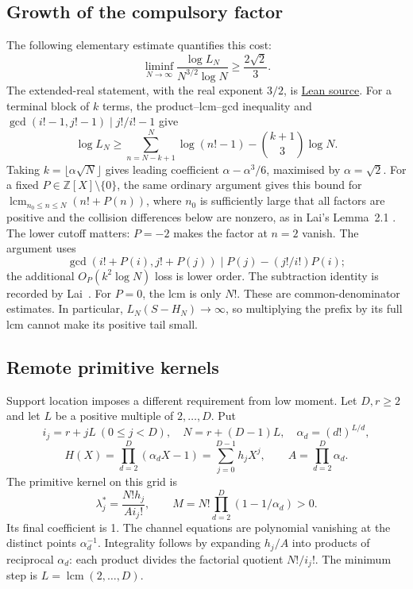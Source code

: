 \documentclass[11pt]{article}
\begin{document}
\subsection{Growth of the compulsory factor}
The following elementary estimate quantifies this cost:
\begin{equation}
\liminf_{N\to\infty}\frac{\log L_N}{N^{3/2}\log N}
\ge\frac{2\sqrt2}{3}.\label{res:lcm-growth}
\end{equation}
The extended-real statement, with the real exponent $3/2$, is
\href{https://github.com/wcook04/plectis-erdos/blob/f36a98bf3d3e6f65f1074e3b800e3293d5b8a51a/ErdosProblems/Erdos68/PaperCompleteLiminf.lean#L42}{Lean source}.
For a terminal block of $k$ terms, the product--lcm--gcd inequality and
$\gcd(i!-1,j!-1)\mid j!/i!-1$ give
\[
\log L_N\ge\sum_{n=N-k+1}^N\log(n!-1)
-\binom{k+1}{3}\log N.
\]
Taking $k=\lfloor\alpha\sqrt N\rfloor$ gives leading coefficient
$\alpha-\alpha^3/6$, maximised by $\alpha=\sqrt2$.  For a fixed
$P\in\mathbb Z[X]\setminus\{0\}$, the same ordinary argument gives this
bound for $\operatorname{lcm}_{n_0\le n\le N}(n!+P(n))$, where $n_0$ is
sufficiently large that all factors are positive and the collision
differences below are nonzero, as in Lai's Lemma~2.1 \cite{lai}.  The
lower cutoff matters: $P=-2$ makes the factor at $n=2$ vanish.
The argument uses
\[
\gcd(i!+P(i),j!+P(j))\mid P(j)-(j!/i!)P(i);
\]
the additional $O_P(k^2\log N)$ loss is lower order.  The subtraction identity
is recorded by Lai~\cite[(2.5)]{lai}.  For $P=0$, the lcm is only $N!$.
These are common-denominator estimates.  In particular,
$L_N(S-H_N)\to\infty$, so multiplying the prefix by its full lcm cannot
make its positive tail small.

\subsection{Remote primitive kernels}\label{sec:compressed-kernel}
Support location imposes a different requirement from low moment.
Let $D,r\ge2$ and let $L$ be a positive multiple of $2,\ldots,D$.  Put
\[
i_j=r+jL\ (0\le j<D),\quad N=r+(D-1)L,\quad
\alpha_d=(d!)^{L/d},
\]
\[
H(X)=\prod_{d=2}^D(\alpha_dX-1)=\sum_{j=0}^{D-1}h_jX^j,
\qquad A=\prod_{d=2}^D\alpha_d.
\]
The primitive kernel on this grid is
\[
\lambda_j^*=\frac{N!h_j}{A i_j!},\qquad
M=N!\prod_{d=2}^D(1-1/\alpha_d)>0.
\]
Its final coefficient is 1.  The channel equations are polynomial vanishing
at the distinct points $\alpha_d^{-1}$.  Integrality follows by expanding
$h_j/A$ into products of reciprocal $\alpha_d$: each product divides the
factorial quotient $N!/i_j!$.  The minimum step is
$L=\operatorname{lcm}(2,\ldots,D)$.
\end{document}
